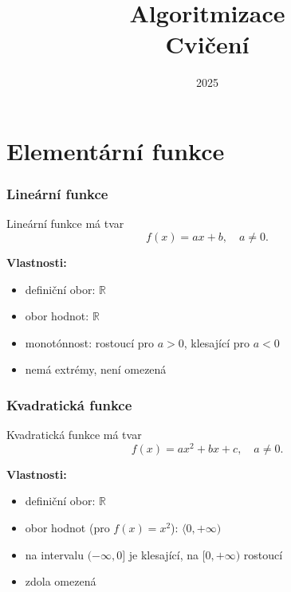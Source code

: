 \documentclass[openany,12pt,a4paper]{book}
\title{\Huge \textbf{Algoritmizace}\\[0.5cm] \Large Cvičení}
\author{}
\date{2025}
\begin{document}
\maketitle
\tableofcontents

\chapter{Elementární funkce}

\subsection*{Lineární funkce}
\begin{definition}
Lineární funkce má tvar
\[
f(x) = ax + b, \quad a \neq 0.
\]
\end{definition}

\textbf{Vlastnosti:}
\begin{itemize}
  \item definiční obor: $\mathbb{R}$
  \item obor hodnot: $\mathbb{R}$
  \item monotónnost: rostoucí pro $a>0$, klesající pro $a<0$
  \item nemá extrémy, není omezená
\end{itemize}

\begin{center}
\end{center}

\subsection*{Kvadratická funkce}
\begin{definition}
Kvadratická funkce má tvar
\[
f(x) = ax^2 + bx + c, \quad a \neq 0.
\]
\end{definition}

\textbf{Vlastnosti:}
\begin{itemize}
  \item definiční obor: $\mathbb{R}$
  \item obor hodnot (pro $f(x)=x^2$): $\langle 0, +\infty )$
  \item na intervalu $(-\infty, 0]$ je klesající, na $[0, +\infty)$ rostoucí
  \item zdola omezená
\end{itemize}
\end{document}

